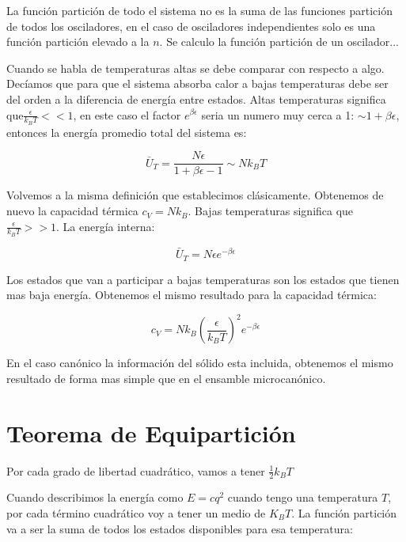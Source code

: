 \documentclass[11pt,fleqn]{book}
\begin{document}
La función partición de todo el sistema no es la suma de las funciones partición de todos los osciladores, en el caso de osciladores independientes solo es una función partición elevado a la $n$. Se calculo la función partición de un oscilador...


Cuando se habla de temperaturas altas se debe comparar con respecto a algo. Decíamos que para que el sistema absorba calor a bajas temperaturas debe ser del orden a la diferencia de energía entre estados. Altas temperaturas significa que$\frac{\epsilon}{k_{B}T}<<1$, en este caso el factor $e^{\beta\epsilon}$ seria un numero muy cerca a 1: $\sim 1+\beta\epsilon$, entonces la energía promedio total del sistema es:

\begin{equation}
        \bar{U}_{T}=\frac{N\epsilon}{1+\beta\epsilon-1}\sim Nk_{B}T
    \label{Eq. 4.34}
\end{equation}

Volvemos a la misma definición que establecimos clásicamente. Obtenemos de nuevo la capacidad térmica $c_{V}=Nk_{B}$. Bajas temperaturas significa que $\frac{\epsilon}{k_{B}T}>>1$. La energía interna:

\begin{equation}
    \bar{U}_{T}=N\epsilon e^{-\beta\epsilon}
    \label{Eq. 4.35}
\end{equation}

Los estados que van a participar a bajas temperaturas son los estados que tienen mas baja energía. Obtenemos el mismo resultado para la capacidad térmica:

\begin{equation}
       c_{V}=Nk_{B}\left(\frac{\epsilon}{k_{B}T}\right)^{2}e^{-\beta\epsilon}
       \label{Eq. 4.36}
\end{equation}

En el caso canónico la información del sólido esta incluida, obtenemos el mismo resultado de forma mas simple que en el ensamble microcanónico. 


\section{Teorema de Equipartición}

\begin{definition}
Por cada grado de libertad cuadrático, vamos a tener $\frac{1}{2}k_{B}T$
\end{definition}

Cuando describimos la energía como $E=cq^{2}$ cuando tengo una temperatura $T$, por cada término cuadrático voy a tener un medio de $K_{B}T$. La función partición va a ser la suma de todos los estados disponibles para esa temperatura:
\end{document}
